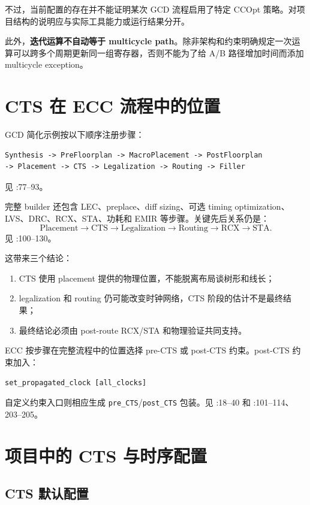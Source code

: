 \documentclass[UTF8,a4paper,11pt,fontset=fandol]{ctexart}
\newcommand{\code}[1]{\nolinkurl{#1}}
\begin{document}
不过，当前配置的存在并不能证明某次 GCD 流程启用了特定 CCOpt 策略。对项目结构的说明应与实际工具能力或运行结果分开。

此外，\textbf{迭代运算不自动等于 multicycle path}。除非架构和约束明确规定一次运算可以跨多个周期更新同一组寄存器，否则不能为了给 A/B 路径增加时间而添加 multicycle exception。

\section{CTS 在 ECC 流程中的位置}

GCD 简化示例按以下顺序注册步骤：
\begin{verbatim}
Synthesis -> PreFloorplan -> MacroPlacement -> PostFloorplan
-> Placement -> CTS -> Legalization -> Routing -> Filler
\end{verbatim}
见 :77--93。

完整 builder 还包含 LEC、preplace、diff sizing、可选 timing optimization、LVS、DRC、RCX、STA、功耗和 EMIR 等步骤。关键先后关系仍是：
\[
  \text{Placement}\rightarrow\text{CTS}\rightarrow
  \text{Legalization}\rightarrow\text{Routing}\rightarrow
  \text{RCX}\rightarrow\text{STA}.
\]
见 :100--130。

这带来三个结论：
\begin{enumerate}
  \item CTS 使用 placement 提供的物理位置，不能脱离布局谈树形和线长；
  \item legalization 和 routing 仍可能改变时钟网络，CTS 阶段的估计不是最终结果；
  \item 最终结论必须由 post-route RCX/STA 和物理验证共同支持。
\end{enumerate}

ECC 按步骤在完整流程中的位置选择 pre-CTS 或 post-CTS 约束。post-CTS 约束加入：
\begin{center}
\code{set_propagated_clock [all_clocks]}
\end{center}
自定义约束入口则相应生成 \code{pre_CTS}/\code{post_CTS} 包装。见 :18--40 和 :101--114、203--205。

\section{项目中的 CTS 与时序配置}

\subsection{CTS 默认配置}
\end{document}
